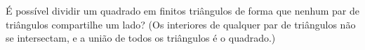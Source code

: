 É possível dividir um quadrado em finitos triângulos de forma que nenhum par de triângulos compartilhe um lado?
(Os interiores de qualquer par de triângulos não se intersectam, e a união de todos os triângulos é o quadrado.)
